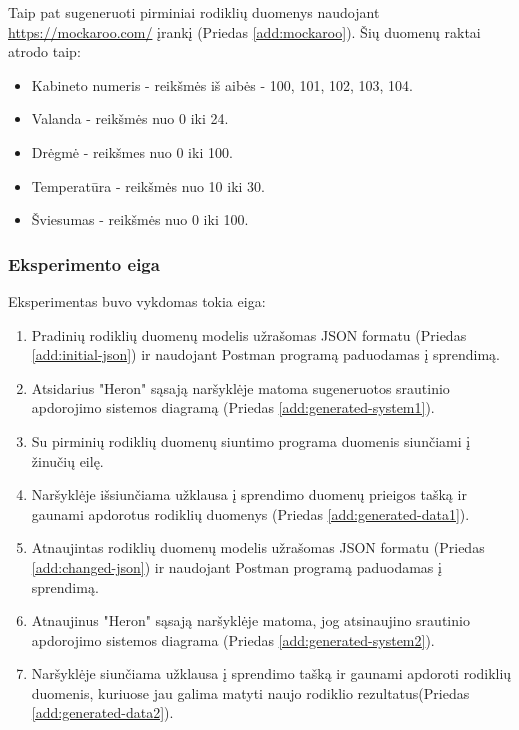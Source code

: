 \documentclass{VUMIFPSbakalaurinis}
\begin{document}
\noindent Taip pat sugeneruoti pirminiai rodiklių duomenys naudojant \url{https://mockaroo.com/} įrankį (Priedas \ref{add:mockaroo}). Šių duomenų raktai atrodo taip:
\begin{itemize}
    \item Kabineto numeris - reikšmės iš aibės - 100, 101, 102, 103, 104.
    \item Valanda - reikšmės nuo 0 iki 24.
    \item Drėgmė - reikšmes nuo 0 iki 100.
    \item Temperatūra - reikšmės nuo 10 iki 30.
    \item Šviesumas - reikšmės nuo 0 iki 100.
\end{itemize}

\subsubsection{Eksperimento eiga}

Eksperimentas buvo vykdomas tokia eiga:
\begin{enumerate}
    \item Pradinių rodiklių duomenų modelis užrašomas JSON formatu (Priedas \ref{add:initial-json}) ir naudojant Postman programą paduodamas į sprendimą.
    \item Atsidarius "Heron" sąsają naršyklėje matoma sugeneruotos srautinio apdorojimo sistemos diagramą (Priedas \ref{add:generated-system1}).
    \item Su pirminių rodiklių duomenų siuntimo programa duomenis siunčiami į žinučių eilę.
    \item Naršyklėje išsiunčiama užklausa į sprendimo duomenų prieigos tašką ir gaunami apdorotus rodiklių duomenys (Priedas \ref{add:generated-data1}).
    \item Atnaujintas rodiklių duomenų modelis užrašomas JSON formatu (Priedas \ref{add:changed-json}) ir naudojant Postman programą paduodamas į sprendimą.
    \item Atnaujinus "Heron" sąsają naršyklėje matoma, jog atsinaujino srautinio apdorojimo sistemos diagrama (Priedas \ref{add:generated-system2}).
    \item Naršyklėje siunčiama užklausa į sprendimo tašką ir gaunami apdoroti rodiklių duomenis, kuriuose jau galima matyti naujo rodiklio rezultatus(Priedas \ref{add:generated-data2}).
\end{enumerate}
\end{document}
